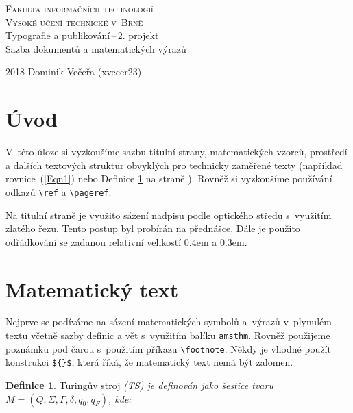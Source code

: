 \documentclass[11pt, a4paper]{article}
\theoremstyle{definition}
\newtheorem{definice}{Definice}
\begin{document}
\begin{titlepage}
\begin{center}
{\Huge
\textsc{Fakulta informačních technologií\\[0.4em]
Vysoké učení technické v~Brně}}\\
{\LARGE
{}
Typografie a publikování\,--\,2. projekt\\[0.3em]
Sazba dokumentů a matematických výrazů}\\
\end{center}
{\Large 2018 \hfill
Dominik Večeřa (xvecer23)}
\end{titlepage}

\begin{twocolumn}

\section*{Úvod}
V~této úloze si vyzkoušíme sazbu titulní strany, matematických vzorců, prostředí a dalších textových struktur obvyklých pro technicky zaměřené texty (například rovnice~(\ref{Eqn1}) nebo Definice \ref{Def1} na straně \pageref{Def1}). Rovněž si vyzkoušíme používání odkazů \verb|\ref| a \verb|\pageref|.

Na titulní straně je využito sázení nadpisu podle optického středu s~využitím zlatého řezu. Tento postup byl
probírán na přednášce. Dále je použito odřádkování se zadanou relativní velikostí 0.4em a 0.3em.
\section{Matematický text}
Nejprve se podíváme na sázení matematických symbolů a~výrazů v~plynulém textu včetně sazby definic a vět s~využitím balíku \verb|amsthm|. Rovněž použijeme poznámku pod čarou s~použitím příkazu \verb|\footnote|. Někdy je vhodné
použít konstrukci \verb|${}$|, která říká, že matematický text nemá být zalomen.

\begin{definice} \label{Def1}
Turingův stroj \textit{(TS) je definován jako šestice tvaru $M = (Q, \Sigma, \Gamma, \delta, q_0, q_F)$, kde:}
\end{definice}


\end{twocolumn}
\end{document}
